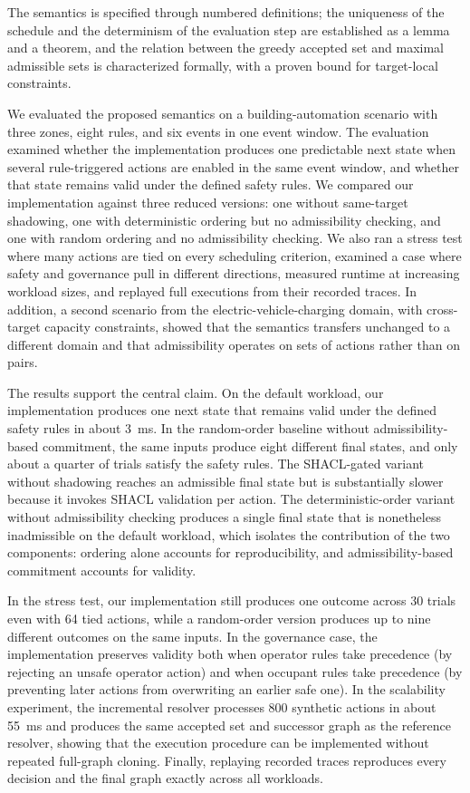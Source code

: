 \documentclass{ieeeaccess}
\theoremstyle{definition}
\theoremstyle{plain}
\theoremstyle{remark}
\begin{document}
The semantics is specified through numbered definitions; the uniqueness of the schedule and the determinism of the evaluation step are established as a lemma and a theorem, and the relation between the greedy accepted set and maximal admissible sets is characterized formally, with a proven bound for target-local constraints.

We evaluated the proposed semantics on a building-automation scenario with three zones, eight rules, and six events in one event window. The evaluation examined whether the implementation produces one predictable next state when several rule-triggered actions are enabled in the same event window, and whether that state remains valid under the defined safety rules. We compared our implementation against three reduced versions: one without same-target shadowing, one with deterministic ordering but no admissibility checking, and one with random ordering and no admissibility checking. We also ran a stress test where many actions are tied on every scheduling criterion, examined a case where safety and governance pull in different directions, measured runtime at increasing workload sizes, and replayed full executions from their recorded traces.
In addition, a second scenario from the electric-vehicle-charging domain, with cross-target capacity constraints, showed that the semantics transfers unchanged to a different domain and that admissibility operates on sets of actions rather than on pairs.


The results support the central claim. On the default workload, our implementation produces one next state that remains valid under the defined safety rules in about 3~ms. In the random-order baseline without admissibility-based commitment, the same inputs produce eight different final states, and only about a quarter of trials satisfy the safety rules. The SHACL-gated variant without shadowing reaches an admissible final state but is substantially slower because it invokes SHACL validation per action.
The deterministic-order variant without admissibility checking produces a single final state that is nonetheless inadmissible on the default workload, which isolates the contribution of the two components: ordering alone accounts for reproducibility, and admissibility-based commitment accounts for validity.

In the stress test, our implementation still produces one outcome across 30 trials even with 64 tied actions, while a random-order version produces up to nine different outcomes on the same inputs. In the governance case, the implementation preserves validity both when operator rules take precedence (by rejecting an unsafe operator action) and when occupant rules take precedence (by preventing later actions from overwriting an earlier safe one). In the scalability experiment, the incremental resolver processes 800 synthetic actions in about 55~ms and produces the same accepted set and successor graph as the reference resolver, showing that the execution procedure can be implemented without repeated full-graph cloning. Finally, replaying recorded traces reproduces every decision and the final graph exactly across all workloads.
\end{document}
